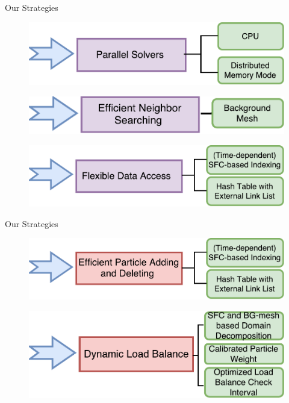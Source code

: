 \documentclass{beamer}
\begin{document}
\begin{frame}{Our Strategies}
\begin{figure}
\flushleft
\includegraphics[scale=0.5]{Parallel}
\label{fig:Parallel}
\end{figure}
%
\begin{figure}
\flushleft
\includegraphics[scale=0.5]{NB_Search}
\label{fig:NB_Search}
\end{figure}
%
\begin{figure}
\flushleft
\includegraphics[scale=0.5]{Data_acc}
\label{fig:Data_acc}
\end{figure}
\end{frame}

\begin{frame}{Our Strategies}
\begin{figure}
\flushleft
\includegraphics[scale=0.5]{P_add_del}
\label{fig:P_add_del}
\end{figure}
%
\begin{figure}
\flushleft
\includegraphics[scale=0.5]{Load_balance}
\label{fig:Requirements}
\end{figure}
\end{frame}
\end{document}
